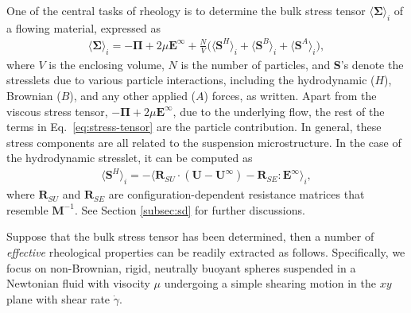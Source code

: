 One of the central tasks of rheology is to determine the bulk stress tensor $\langle \bm{\Sigma} \rangle_i$ of a flowing material, expressed as \citep{batchelor_1970, batchelor_1977}
\begin{equation} \label{eq:stress-tensor}
  \begin{aligned}
    \langle \bm{\Sigma} \rangle_i = -\bm{\Pi} +2\mu \bm{E}^\infty + \frac{N}{V} 
    \bigg(\langle \bm{S}^H \rangle_i + \langle \bm{S}^B \rangle_i +\langle \bm{S}^A \rangle_i \bigg), 
  \end{aligned}
\end{equation} 
where $V$ is the enclosing volume,
$N$ is the number of particles,
and $\bm{S}$'s denote the stresslets due to various particle interactions, including the hydrodynamic ($H$), Brownian ($B$), and any other applied ($A$) forces, as written.
Apart from the viscous stress tensor, $-\bm{\Pi} +2\mu \bm{E}^\infty$, due to the underlying flow, the rest of the terms in Eq.\ \eqref{eq:stress-tensor} are the particle contribution.
In general, these stress components are all related to the suspension microstructure.
In the case of the hydrodynamic stresslet, it can be computed as
\begin{equation} 
  \begin{aligned}
    \langle \bm{S}^H \rangle_i = - \langle \bm{R}_{SU}\cdot(\bm{U}-\bm{U}^\infty) - \bm{R}_{SE}:\bm{E}^\infty \rangle_i , 
  \end{aligned}
\end{equation}
where $\bm{R}_{SU}$ and $\bm{R}_{SE}$ are configuration-dependent resistance matrices that resemble $\bm{M}^{-1}$.
See Section \ref{subsec:sd} for further discussions.

\bigskip
Suppose that the bulk stress tensor has been determined, then a number of \emph{effective} rheological properties can be readily extracted as follows.
Specifically, we focus on non-Brownian, rigid, neutrally buoyant spheres suspended in a Newtonian fluid with visocity $\mu$ undergoing a simple shearing motion in the $xy$ plane with shear rate $\dot{\gamma}$.

